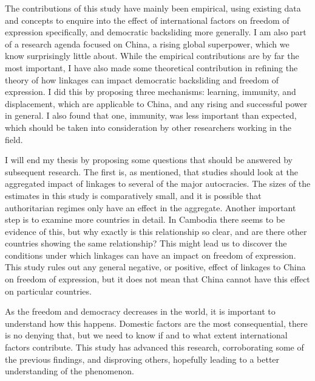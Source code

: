 The contributions of this study have mainly been empirical, using existing data and concepts to enquire into the effect of international factors on freedom of expression specifically, and democratic backsliding more generally. I am also part of a research agenda focused on China, a rising global superpower, which we know surprisingly little about. While the empirical contributions are by far the most important, I have also made some theoretical contribution in refining the theory of how linkages can impact democratic backsliding and freedom of expression. I did this by proposing three mechanisms: learning, immunity, and displacement, which are applicable to China, and any rising and successful power in general. I also found that one, immunity, was less important than expected, which should be taken into consideration by other researchers working in the field. 

I will end my thesis by proposing some questions that should be answered by subsequent research. The first is, as mentioned, that studies should look at the aggregated impact of linkages to several of the major autocracies. The sizes of the estimates in this study is comparatively small, and it is possible that authoritarian regimes only have an effect in the aggregate. Another important step is to examine more countries in detail. In Cambodia there seems to be evidence of this, but why exactly is this relationship so clear, and are there other countries showing the same relationship? This might lead us to discover the conditions under which linkages can have an impact on freedom of expression. This study rules out any general negative, or positive, effect of linkages to China on freedom of expression, but it does not mean that China cannot have this effect on particular countries.

As the freedom and democracy decreases in the world, it is important to understand how this happens. Domestic factors are the most consequential, there is no denying that, but we need to know if and to what extent international factors contribute. This study has advanced this research, corroborating some of the previous findings, and disproving others, hopefully leading to a better understanding of the phenomenon.